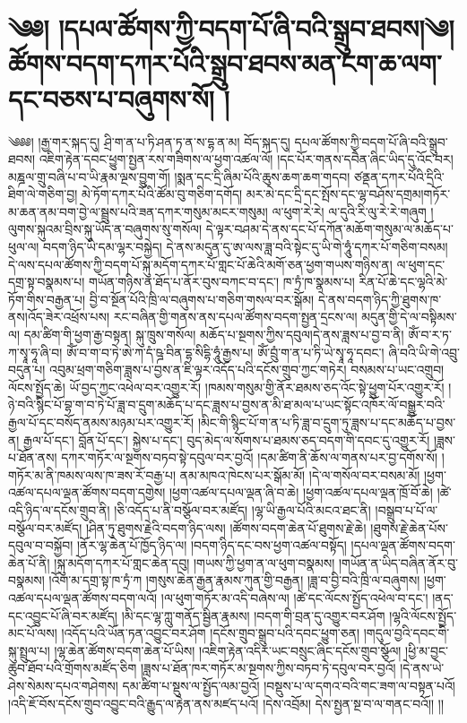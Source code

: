 \chapter{༄༅། །དཔལ་ཚོགས་ཀྱི་བདག་པོ་ཞི་བའི་སྒྲུབ་ཐབས།༄། ཚོགས་བདག་དཀར་པོའི་སྒྲུབ་ཐབས་མན་ངག་ཆ་ལག་དང་བཅས་པ་བཞུགས་སོ། །}༄༅༅། །རྒྱ་གར་སྐད་དུ། ཤྲི་ག་ན་པ་ཏི་ཤན་ཏ་ན་ས་དྷ་ན་མ། བོད་སྐད་དུ། དཔལ་ཚོགས་ཀྱི་བདག་པོ་ཞི་བའི་སྒྲུབ་ཐབས། འཇིག་རྟེན་དབང་ཕྱུག་སྤྱན་རས་གཟིགས་ལ་ཕྱག་འཚལ་ལོ། །དང་པོར་གནས་དབཻན་ཞིང་ཡིད་དུ་འོང་བར། མཎྜལ་གྲུ་བཞི་པ་བ་ཡི་རྣམ་ལྔས་བྱུག་གོ། །སྨན་དང་དྲི་ཞིམ་པོའི་ཆུས་ཆག་ཆག་གདབ། ཙནྡན་དཀར་པོའི་དྲིའི་ཐིག་ལེ་གཅིག་བྱ། མེ་ཏོག་དཀར་པོའི་ཚོམ་བུ་གཅིག་དགོད། མར་མེ་དང་དྲི་དང་སྤོས་དང་ལྷ་བཤོས་དགྲམ།གཏོར་མ་ཆན་ནམ་བག་བྱེ་ལ་སྦྲུས་པའི་ཟན་དཀར་གསུམ་མངར་གསུམ། ལ་ཕུག་རེ་རེ། ལ་དུའི་རི་ལུ་རེ་རེ་གཞུག །ལུགས་སྐུའམ་བྲིས་སྐུ་ཡོད་ན་བཞུགས་སུ་གསོལ། དེ་ལྟར་བཤམ་དེ་ནས་དང་པོ་དཀོན་མཆོག་གསུམ་ལ་མཆོད་པ་ཕུལ་ལ། བདག་ཉིད་ཡི་དམ་ལྷར་བསྐྱེད། དེ་ནས་མདུན་དུ་ཨ་ལས་ཟླ་བའི་སྟེང་དུ་ཡི་གེ་ཧཱུཾ་དཀར་པོ་གཅིག་བསམ། དེ་ལས་དཔལ་ཚོགས་ཀྱི་བདག་པོ་སྐུ་མདོག་དཀར་པོ་གླང་པོ་ཆེའི་མགོ་ཅན་ཕྱག་གཡས་གཉིས་ན། ལ་ཕུག་དང་དགྲ་སྟ་བསྣམས་པ། གཡོན་གཉིས་ན་ཐོད་པ་ནོར་བུས་བཀང་བ་དང་། ཁ་ཏྲཾ་ཁ་སྣམས་པ། རིན་པོ་ཆེ་དང་ལྷའི་མེ་ཏོག་གིས་བརྒྱན་པ། བྱི་བ་སྔོན་པོའི་ཁྲི་ལ་བཞུགས་པ་གཅིག་གསལ་བར་སྒོམ། དེ་ནས་བདག་ཉིད་ཀྱི་ཐུགས་ཁ་ནས།འོད་ཟེར་འཕྲོས་པས། རང་བཞིན་གྱི་གནས་ནས་དཔལ་ཚོགས་བདག་སྤྱན་དྲངས་ལ། མདུན་གྱི་དེ་ལ་བསྟིམས་ལ། དམ་ཚིག་གི་ཕྱག་རྒྱ་བསྟན། སྐུ་ཁྲུས་གསོལ། མཆོད་པ་སྔགས་ཀྱིས་དབུལ།དེ་ནས་ཟླས་པ་བྱ་བ་ནི། ཨོཾ་བ་ར་ཏ་ཀ་སྭཱ་ཧཱ་ཞི་བ། ཨོཾ་བ་ག་བ་ཏེ་ཨེ་ཀ་དཾ་ཥྜ་བིན་དྷ་སིདྷི་ཧཱུཾ་རྒྱས་པ། ཨོཾ་བྲུཾ་ག་ན་པ་ཏི་ཡེ་སྭཱ་ཧཱ་དབང་། ཞི་བའི་ཡི་གེ་འབྲུ་བདུན་པ། འབུམ་ཕྲག་གཅིག་ཟླས་པ་བྱས་ན་ཇི་ལྟར་འདོད་པའི་དངོས་གྲུབ་ཀྱང་གཏེར། བསམས་པ་ཡང་འགྲུབ། ལོངས་སྤྱོད་ཆེ། ཡོ་བྱད་ཀྱང་འཕེལ་བར་འགྱུར་རོ། །ཁམས་གསུམ་གྱི་ནོར་ཐམས་ཅད་འོང་སྟེ་ཕྱུག་པོར་འགྱུར་རོ། །ཉེ་བའི་སྙིང་པོ་བྷ་ག་བ་ཏེ་པོ་ཟླ་བ་དྲུག་མཆོད་པ་དང་ཟླས་པ་བྱས་ན་མི་ཐ་མལ་པ་ཡང་སྟོང་འཁོར་ལོ་བསྒྱུར་བའི་རྒྱལ་པོ་དང་བསོད་ནམས་མཉམ་པར་འགྱུར་རོ། །མིང་གི་སྙིང་པོ་ག་ན་པ་ཏི་ཟླ་བ་དྲུག་ཏུ་ཟླས་པ་དང་མཆོད་པ་བྱས་ན། རྒྱལ་པོ་དང་། བློན་པོ་དང་། སྐྱེས་པ་དང་། བུད་མེད་ལ་སོགས་པ་ཐམས་ཅད་བདག་གི་དབང་དུ་འགྱུར་རོ། །ཟླས་པ་ཐོན་ནས། དཀར་གཏོར་ལ་སྔགས་བཏབ་སྟེ་དབུལ་བར་བྱའོ། །དམ་ཚིག་ནི་ཆོས་ལ་གནས་པར་བྱ་དགོས་སོ། །གཏོར་མ་ནི་ཁམས་ལས་ཁ་ཟས་རོ་བརྒྱ་པ། ནམ་མཁའ་ཁེངས་པར་སྒོམ་མོ། །དེ་ལ་གསོལ་བར་བསམ་མོ། །ཕྱག་འཚལ་དཔལ་ལྡན་ཚོགས་བདག་དགྱེས། །ཕྱག་འཚལ་དཔལ་ལྡན་ཞི་བ་ཆེ། །ཕྱག་འཚལ་དཔལ་ལྡན་ཁྲོ་བོ་ཆེ། །ཚེ་འདི་ཉིད་ལ་དངོས་གྲུབ་ནི། །ཅི་འདོད་པ་ནི་བསྩོལ་བར་མཛོད། །ལྷ་ཡི་རྒྱལ་པོའི་མངའ་ཐང་ནི། །བསྒྲུབ་པ་པོ་ལ་བསྩོལ་བར་མཛོད། །ཤིན་ཏུ་ཐུགས་རྗེའི་བདག་ཉིད་ལས། །ཚོགས་བདག་ཆེན་པོ་ཐུགས་རྗེ་ཆེ། །ཐུགས་རྗེ་ཆེན་པོས་དབུལ་བ་བསྐྱོབ། །ནོར་ལྷ་ཆེན་པོ་ཁྱོད་ཉིད་ལ། །བདག་ཉིད་དང་བས་ཕྱག་འཚལ་བསྟོད། །དཔལ་ལྡན་ཚོགས་བདག་ཆེན་པོ་ནི། །སྐུ་མདོག་དཀར་པོ་གླང་ཆེན་དབུ། །གཡས་ཀྱི་ཕྱག་ན་ལ་ཕུག་བསྣམས། །གཡོན་ན་ཡིད་བཞིན་ནོར་བུ་བསྣམས། །འོག་མ་དགྲ་སྟ་ཁ་ཏྲཾ་ཀ །གསུས་ཆེན་རྒྱན་རྣམས་ཀུན་གྱི་བརྒྱན། །ཟླ་བ་བྱི་བའི་ཁྲི་ལ་བཞུགས། །ཕྱག་འཚལ་དཔལ་ལྡན་ཚོགས་བདག་ལའོ། །ལ་ཕུག་གཏོར་མ་འདི་བཞེས་ལ། །ཚེ་དང་ལོངས་སྤྱོད་འཕེལ་བ་དང་། །ནད་དང་འབྱུང་པོ་ཞི་བར་མཛོད། །མི་དང་ལྷ་ཀླུ་གནོད་སྦྱིན་རྣམས། །བདག་གི་བྲན་དུ་འགྱུར་བར་ཤོག །ལྷའི་ལོངས་སྤྱོད་མང་པོ་ལས། །འདོད་པའི་ཡོན་ཏན་འབྱུང་བར་ཤོག །དངོས་གྲུབ་སྒྲུབ་པའི་དབང་ཕྱུག་ཅན། །གདུལ་བྱའི་དབང་གི་སྐུ་སྤྲུལ་པ། །ལྷ་ཆེན་ཚོགས་བདག་ཆེན་པོ་ཡིས། །འཇིག་རྟེན་འདིར་ཡང་བསྲུང་ཞིང་དངོས་གྲུབ་སྩོལ། །ཕྱི་མ་བྱང་ཆུབ་ཐོབ་པའི་གྲོགས་མཛོད་ཅིག །ཟླས་པ་ཐོན་ཁར་གཏོར་མ་སྔགས་ཀྱིས་བཏབ་ཏེ་དབུལ་བར་བྱའོ། །དེ་ནས་ཡེ་ཤེས་སེམས་དཔའ་གཤེགས། དམ་ཚིག་པ་སྡུས་ལ་སྤྱོད་ལམ་བྱའོ། །བསྡུས་པ་ལ་དགའ་བའི་གང་ཟག་ལ་བསྟན་པའོ། །འདི་ཇོ་བོས་དངོས་གྲུབ་འབྱུང་བའི་རྒྱུད་ལ་རྟེན་ནས་མཛད་པའོ། །དེས་འབྲོམ། དེས་སྤྱན་སྔ་བ་ལ་གནང་བའོ།། །།